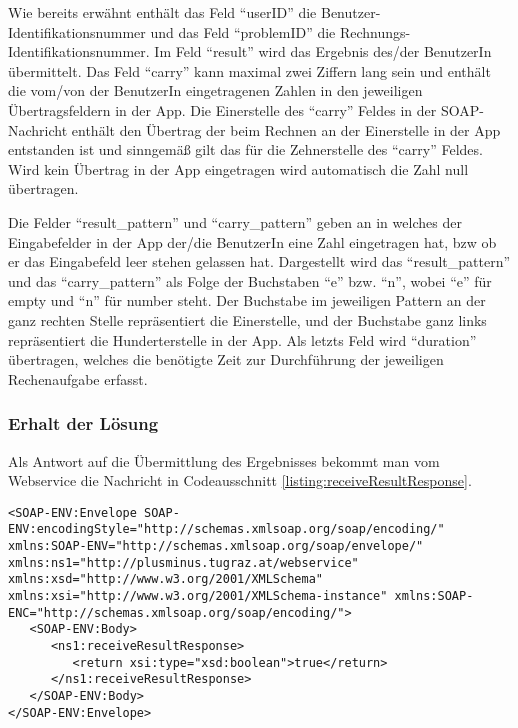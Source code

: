 Wie bereits erwähnt enthält das Feld \enquote{userID} die Benutzer-Identifikationsnummer und das 
Feld \enquote{problemID} die Rechnungs-Identifikationsnummer. Im Feld \enquote{result} wird das
Ergebnis des/der BenutzerIn übermittelt. Das Feld \enquote{carry} kann maximal zwei Ziffern lang sein 
und enthält die vom/von der BenutzerIn eingetragenen Zahlen in den jeweiligen Übertragsfeldern in der App.
Die Einerstelle des \enquote{carry} Feldes in der SOAP-Nachricht enthält den Übertrag der beim Rechnen 
an der Einerstelle in der App entstanden ist und sinngemäß gilt das für die Zehnerstelle des \enquote{carry}
Feldes. Wird kein Übertrag in der App eingetragen wird automatisch die Zahl null übertragen.

Die Felder \enquote{result\_pattern} und \enquote{carry\_pattern} geben an in welches der Eingabefelder
in der App der/die BenutzerIn eine Zahl eingetragen hat, bzw ob er das Eingabefeld leer stehen gelassen hat.
Dargestellt wird das \enquote{result\_pattern} und das \enquote{carry\_pattern} als Folge der Buchstaben
\enquote{e} bzw. \enquote{n}, wobei \enquote{e} für empty und \enquote{n} für number steht. Der Buchstabe
im jeweiligen Pattern an der ganz rechten Stelle repräsentiert die Einerstelle, und der Buchstabe ganz
links repräsentiert die Hunderterstelle in der App. Als letzts Feld wird \enquote{duration} übertragen, welches
die benötigte Zeit zur Durchführung der jeweiligen Rechenaufgabe erfasst.

\subsubsection{Erhalt der Lösung}
Als Antwort auf die Übermittlung des Ergebnisses bekommt man vom Webservice die Nachricht in Codeausschnitt
\ref{listing:receiveResultResponse}. 
\begin{lstlisting}[caption=Antwort auf Übermittlung des Ergebnisses, label=listing:receiveResultResponse]
<SOAP-ENV:Envelope SOAP-ENV:encodingStyle="http://schemas.xmlsoap.org/soap/encoding/" xmlns:SOAP-ENV="http://schemas.xmlsoap.org/soap/envelope/" xmlns:ns1="http://plusminus.tugraz.at/webservice" xmlns:xsd="http://www.w3.org/2001/XMLSchema" xmlns:xsi="http://www.w3.org/2001/XMLSchema-instance" xmlns:SOAP-ENC="http://schemas.xmlsoap.org/soap/encoding/">
   <SOAP-ENV:Body>
      <ns1:receiveResultResponse>
         <return xsi:type="xsd:boolean">true</return>
      </ns1:receiveResultResponse>
   </SOAP-ENV:Body>
</SOAP-ENV:Envelope>
\end{lstlisting}

